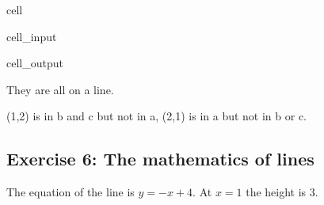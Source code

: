 \documentclass[letterpaper,10pt,english]{jupyterBook}
\begin{document}
\begin{sphinxuseclass}{cell}\begin{sphinxVerbatimInput}

\begin{sphinxuseclass}{cell_input}
\begin{sphinxVerbatim}[commandchars=\\\{\}]
\end{sphinxVerbatim}

\end{sphinxuseclass}\end{sphinxVerbatimInput}
\begin{sphinxVerbatimOutput}

\begin{sphinxuseclass}{cell_output}
\noindent{}

\end{sphinxuseclass}\end{sphinxVerbatimOutput}

\end{sphinxuseclass}
\sphinxAtStartPar
They are all on a line.

\sphinxAtStartPar
(1,2) is in b and c but not in a, (2,1) is in a but not in b or c.


\subsection{Exercise 6: The mathematics of lines}
\label{\detokenize{exercises_unit_4:exercise-6-the-mathematics-of-lines}}
\sphinxAtStartPar
The equation of the line is \(y = -x + 4\). At \(x=1\) the height is 3.
\end{document}
